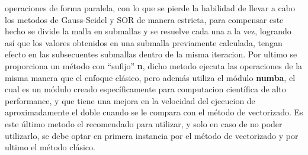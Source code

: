 \documentclass[letterpaper, openright, 12pt]{book}
\begin{document}
    operaciones de forma paralela, con lo que se pierde la habilidad de
    llevar a cabo los metodos de Gauss-Seidel y SOR de manera estricta,
    para compensar este hecho se divide la malla en submallas y se resuelve
    cada una a la vez, logrando así que los valores obtenidos en una
    submalla previamente calculada, tengan efecto en las subsecuentes
    submallas dentro de la misma iteracion. Por ultimo se proporciona un
    método con ``sufijo'' \textbf{\textunderscore n}, dicho metodo ejecuta
    las operaciones de la misma manera que el enfoque clásico, pero además
    utiliza el módulo \textbf{numba}, el cual es un módulo creado
    específicamente para computacion científica de alto performance, y que
    tiene una mejora en la velocidad del ejecucion de aproximadamente el
    doble cuando se le compara con el método de vectorizado. Es este último
    metodo el recomendado para utilizar, y solo en caso de no poder
    utilizarlo, se debe optar en primera instancia por el método de vectorizado
    y por ultimo el método clásico.
\end{document}
